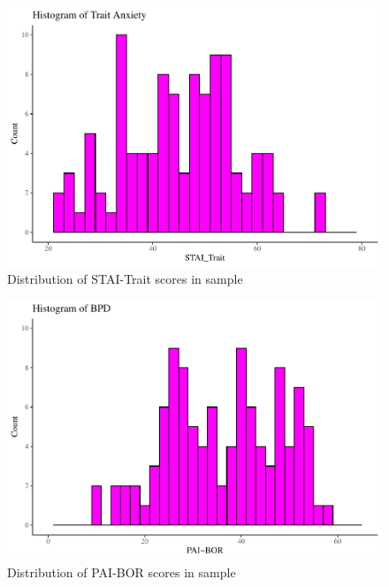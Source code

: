 \documentclass[
  man,floatsintext]{apa7}
\begin{document}
\begin{figure}
\includegraphics[width=1\linewidth]{d2m-Psychopathy_files/figure-latex/STAI-descriptives-1} \caption{Distribution of STAI-Trait scores in sample}\label{fig:STAI-descriptives-appendix}
\end{figure}

\begin{figure}
\includegraphics[width=1\linewidth]{d2m-Psychopathy_files/figure-latex/PAI-descriptives-1} \caption{Distribution of PAI-BOR scores in sample}\label{fig:PAIBOR-descriptives-appendix}
\end{figure}
\end{document}
